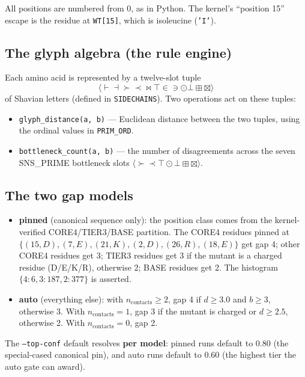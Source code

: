 \documentclass{article}
\begin{document}
All positions are numbered from 0, as in Python. The kernel's ``position 15''
escape is the residue at \texttt{WT[15]}, which is isoleucine (\texttt{'I'}).

\subsection{The glyph algebra (the rule engine)}

Each amino acid is represented by a twelve-slot tuple
\[
\langle \vdash \dashv \succ \prec \bowtie \top \in \ni \odot \bot \boxplus \boxtimes \rangle
\]
of Shavian letters (defined in \texttt{SIDECHAINS}). Two operations act on
these tuples:

\begin{itemize}
  \item \texttt{glyph\_distance(a, b)} --- Euclidean distance between the two
        tuples, using the ordinal values in \texttt{PRIM\_ORD}.
  \item \texttt{bottleneck\_count(a, b)} --- the number of disagreements across
        the seven SNS\_PRIME bottleneck slots
        \(\langle \succ \prec \top \odot \bot \boxplus \boxtimes \rangle\).
\end{itemize}

\subsection{The two gap models}

\begin{itemize}
  \item \textbf{pinned} (canonical sequence only): the position class comes from
        the kernel-verified CORE4/TIER3/BASE partition. The CORE4 residues
        pinned at
        \(\{(15,D),(7,E),(21,K),(2,D),(26,R),(18,E)\}\)
        get gap 4; other CORE4 residues get 3; TIER3 residues get 3 if the
        mutant is a charged residue (D/E/K/R), otherwise 2; BASE residues get 2.
        The histogram \(\{4:6, 3:187, 2:377\}\) is asserted.
  \item \textbf{auto} (everything else): with \(n_{\text{contacts}} \geq 2\),
        gap 4 if \(d \geq 3.0\) and \(b \geq 3\), otherwise 3. With
        \(n_{\text{contacts}} = 1\), gap 3 if the mutant is charged or
        \(d \geq 2.5\), otherwise 2. With \(n_{\text{contacts}} = 0\), gap 2.
\end{itemize}

The \texttt{--top-conf} default resolves \textbf{per model}: pinned runs
default to 0.80 (the special-cased canonical pin), and auto runs default to 0.60
(the highest tier the auto gate can award).
\end{document}
